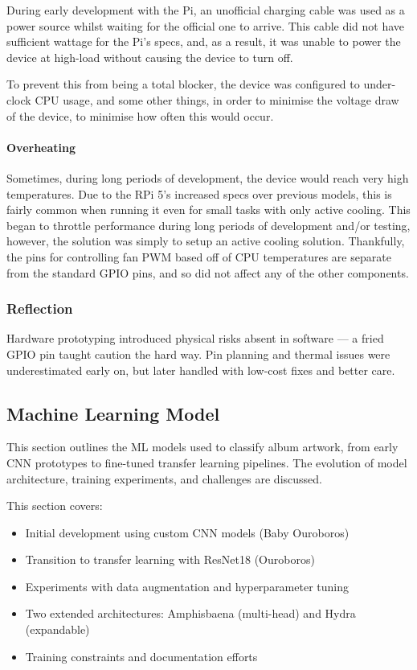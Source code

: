                     During early development with the Pi, an unofficial charging cable was used as a power source whilst waiting for the official one to arrive. This cable did not have sufficient wattage for the Pi's specs, and, as a result, it was unable to power the device at high-load without causing the device to turn off.
    
                    To prevent this from being a total blocker, the device was configured to under-clock CPU usage, and some other things, in order to minimise the voltage draw of the device, to minimise how often this would occur.
    
                \paragraph{Overheating}
    
                    Sometimes, during long periods of development, the device would reach very high temperatures. Due to the RPi 5's increased specs over previous models, this is fairly common when running it even for small tasks with only active cooling. This began to throttle performance during long periods of development and/or testing, however, the solution was simply to setup an active cooling solution. Thankfully, the pins for controlling fan PWM based off of CPU temperatures are separate from the standard GPIO pins, and so did not affect any of the other components.
    
            \subsubsection*{Reflection}
                Hardware prototyping introduced physical risks absent in software — a fried GPIO pin taught caution the hard way. Pin planning and thermal issues were underestimated early on, but later handled with low-cost fixes and better care.
    
      \subsection{Machine Learning Model} \label{sec:mlImp}
    
            This section outlines the ML models used to classify album artwork, from early CNN prototypes to fine-tuned transfer learning pipelines. The evolution of model architecture, training experiments, and challenges are discussed.
    
            This section covers:
            \begin{itemize}
              \item Initial development using custom CNN models (Baby Ouroboros)
              \item Transition to transfer learning with ResNet18 (Ouroboros)
              \item Experiments with data augmentation and hyperparameter tuning
              \item Two extended architectures: Amphisbaena (multi-head) and Hydra (expandable)
              \item Training constraints and documentation efforts
            \end{itemize}
    
